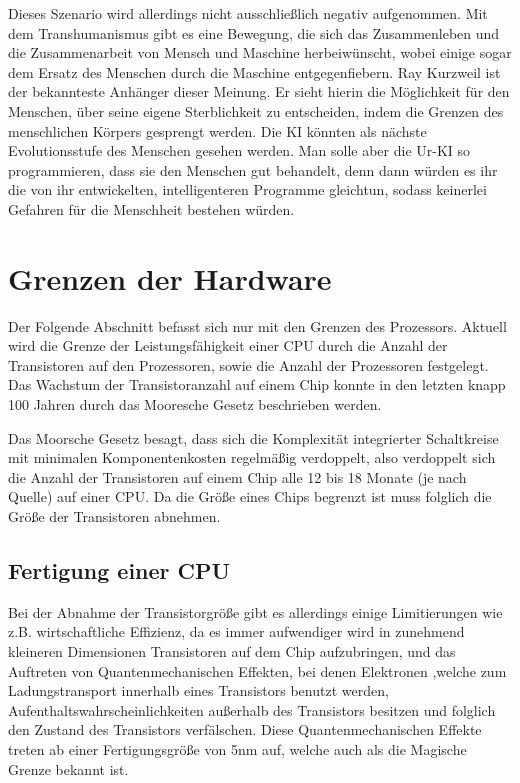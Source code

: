 Dieses Szenario wird allerdings nicht ausschließlich negativ aufgenommen.
Mit dem Transhumanismus gibt es eine Bewegung, die sich das Zusammenleben und die Zusammenarbeit von Mensch und Maschine herbeiwünscht, wobei einige sogar dem Ersatz des Menschen durch die Maschine entgegenfiebern.
Ray Kurzweil ist der bekannteste Anhänger dieser Meinung.
Er sieht hierin die Möglichkeit für den Menschen, über seine eigene Sterblichkeit zu entscheiden, indem die Grenzen des menschlichen Körpers gesprengt werden.
Die KI könnten als nächste Evolutionsstufe des Menschen gesehen werden.
Man solle aber die Ur-KI so programmieren, dass sie den Menschen gut behandelt, denn dann würden es ihr die von ihr entwickelten, intelligenteren Programme gleichtun, sodass keinerlei Gefahren für die Menschheit bestehen würden.

\section{Grenzen der Hardware}
Der Folgende Abschnitt befasst sich nur mit den Grenzen des Prozessors.
Aktuell wird die Grenze der Leistungsfähigkeit einer CPU durch die Anzahl der Transistoren auf den Prozessoren, sowie die Anzahl der Prozessoren festgelegt.
Das Wachstum der Transistoranzahl auf einem Chip konnte in den letzten knapp 100 Jahren durch das Mooresche Gesetz beschrieben werden.

Das Moorsche Gesetz besagt, dass sich die Komplexität integrierter Schaltkreise mit minimalen Komponentenkosten regelmäßig verdoppelt, also verdoppelt sich die Anzahl der Transistoren auf einem Chip alle 12 bis 18 Monate (je nach Quelle) auf einer CPU. Da die Größe eines Chips begrenzt ist muss folglich die Größe der Transistoren abnehmen.

\subsection{Fertigung einer CPU}

Bei der Abnahme der Transistorgröße gibt es allerdings einige Limitierungen wie z.B. wirtschaftliche Effizienz, da es immer aufwendiger wird in zunehmend kleineren Dimensionen Transistoren auf dem Chip aufzubringen, und das Auftreten von Quantenmechanischen Effekten, bei denen Elektronen ,welche zum Ladungstransport innerhalb eines Transistors benutzt werden, Aufenthaltswahrscheinlichkeiten außerhalb des Transistors besitzen und folglich den Zustand des Transistors verfälschen.
Diese Quantenmechanischen Effekte treten ab einer Fertigungsgröße von 5nm auf, welche auch als die Magische Grenze bekannt ist.

